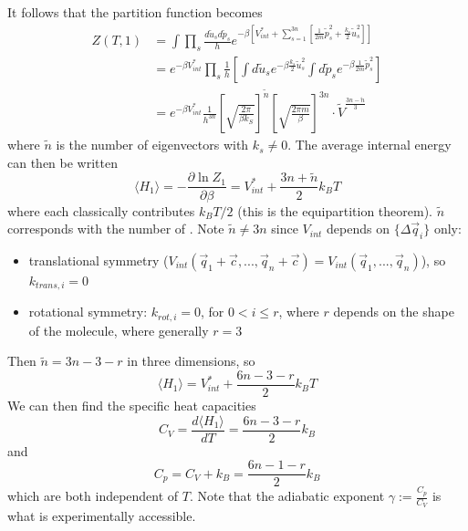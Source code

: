\documentclass[12pt, a4paper, oneside, openright, titlepage]{book}
\begin{document}
It follows that the partition function becomes \begin{align*}
    Z(T,1) &= \int\prod_s\frac{d\tilde{u}_sd\tilde{p}_s}{h}e^{-\beta\left[V_{int}^* + \sum_{s=1}^{3n}\left[\frac{1}{2m}\tilde{p}_s^2 + \frac{k_s}{2}\tilde{u}_s^2\right]\right]} \\
    &=e^{-\beta V_{int}^*}\prod_s\frac{1}{h}\left[\int d\tilde{u}_se^{-\beta\frac{k_s}{2}\tilde{u}_s^2}\int d\tilde{p}_se^{-\beta\frac{1}{2m}\tilde{p}_s^2}\right] \\
    &= e^{-\beta V_{int}^*}\frac{1}{h^{3n}}\left[\sqrt{\frac{2\pi}{\beta k_S}}\right]^{\tilde{n}}\left[\sqrt{\frac{2\pi m}{\beta}}\right]^{3n}\cdot \tilde{V}^{\frac{3n-\tilde{n}}{3}}
\end{align*}
where $\tilde{n}$ is the number of eigenvectors with $k_s \neq 0$. The average internal energy can then be written \begin{equation*}
    \langle H_1\rangle = -\frac{\partial \ln Z_1}{\partial \beta} = V_{int}^*+\frac{3n+\tilde{n}}{2}k_BT
\end{equation*}
where each  classically contributes $k_BT/2$ (this is the equipartition theorem). $\tilde{n}$ corresponds with the number of . Note $\tilde{n} \neq 3n$ since $V_{int}$ depends on $\{\Delta \vec{q}_i\}$ only: \begin{itemize}
    \item translational symmetry ($V_{int}(\vec{q}_1+\vec{c},...,\vec{q}_n+\vec{c}) = V_{int}(\vec{q}_1,...,\vec{q}_n)$), so $k_{trans,i} = 0$
    \item rotational symmetry: $k_{rot,i} = 0$, for $0 < i \leq r$, where $r$ depends on the shape of the molecule, where generally $r = 3$
\end{itemize}
Then $\tilde{n} = 3n-3-r$ in three dimensions, so \begin{equation*}
    \langle H_1\rangle = V_{int}^* + \frac{6n-3-r}{2}k_BT
\end{equation*}
We can then find the specific heat capacities \begin{equation*}
    C_V = \frac{d\langle H_1\rangle}{dT} = \frac{6n-3-r}{2}k_B
\end{equation*}
and \begin{equation*}
    C_p = C_V+k_B = \frac{6n-1-r}{2}k_B
\end{equation*}
which are both independent of $T$. Note that the adiabatic exponent $\gamma :=\frac{C_p}{C_V}$ is what is experimentally accessible.
\end{document}
